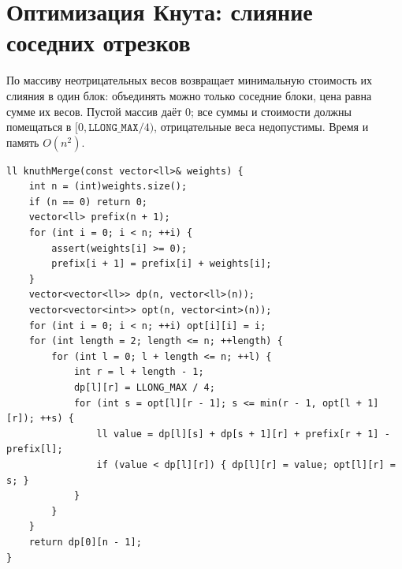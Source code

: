\section{Оптимизация Кнута: слияние соседних отрезков}
По массиву неотрицательных весов возвращает минимальную стоимость их слияния в один блок: объединять можно только соседние блоки, цена равна сумме их весов.
Пустой массив даёт $0$; все суммы и стоимости должны помещаться в $[0,\texttt{LLONG\_MAX}/4)$, отрицательные веса недопустимы.
Время и память $O(n^2)$.
\begin{lstlisting}[name=optimization_knuth]
ll knuthMerge(const vector<ll>& weights) {
    int n = (int)weights.size();
    if (n == 0) return 0;
    vector<ll> prefix(n + 1);
    for (int i = 0; i < n; ++i) {
        assert(weights[i] >= 0);
        prefix[i + 1] = prefix[i] + weights[i];
    }
    vector<vector<ll>> dp(n, vector<ll>(n));
    vector<vector<int>> opt(n, vector<int>(n));
    for (int i = 0; i < n; ++i) opt[i][i] = i;
    for (int length = 2; length <= n; ++length) {
        for (int l = 0; l + length <= n; ++l) {
            int r = l + length - 1;
            dp[l][r] = LLONG_MAX / 4;
            for (int s = opt[l][r - 1]; s <= min(r - 1, opt[l + 1][r]); ++s) {
                ll value = dp[l][s] + dp[s + 1][r] + prefix[r + 1] - prefix[l];
                if (value < dp[l][r]) { dp[l][r] = value; opt[l][r] = s; }
            }
        }
    }
    return dp[0][n - 1];
}
\end{lstlisting}
%

\iffalse

